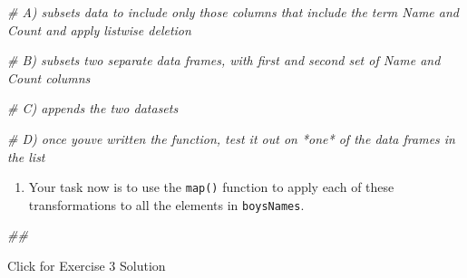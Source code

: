 \documentclass[
]{book}
\newenvironment{Shaded}{\begin{snugshade}}{\end{snugshade}}
\newcommand{\CommentTok}[1]{\textcolor[rgb]{0.56,0.35,0.01}{\textit{#1}}}
\providecommand{\tightlist}{%
  \setlength{\itemsep}{0pt}\setlength{\parskip}{0pt}}
\begin{document}
\begin{Shaded}
\begin{Highlighting}[]
\CommentTok{\# A) subsets data to include only those columns that include the term \textasciigrave{}Name\textasciigrave{} and \textasciigrave{}Count\textasciigrave{} and apply listwise deletion}

\CommentTok{\# B) subsets two separate data frames, with first and second set of \textasciigrave{}Name\textasciigrave{} and \textasciigrave{}Count\textasciigrave{} columns}

\CommentTok{\# C) appends the two datasets}

\CommentTok{\# D) once you\textquotesingle{}ve written the function, test it out on *one* of the data frames in the list}
\end{Highlighting}
\end{Shaded}

\begin{enumerate}
\def\labelenumi{\arabic{enumi}.}
\setcounter{enumi}{1}
\tightlist
\item
  Your task now is to use the \texttt{map()} function to apply each of these transformations to all the elements in \texttt{boysNames}.
\end{enumerate}

\begin{Shaded}
\begin{Highlighting}[]
\CommentTok{\#\# }
\end{Highlighting}
\end{Shaded}

{Click for Exercise 3 Solution}
\end{document}
